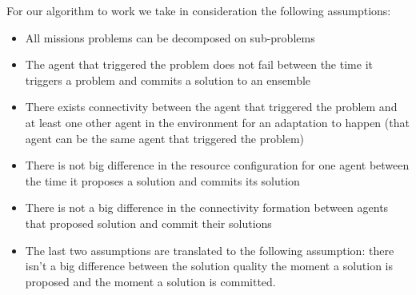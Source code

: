 \documentclass[journal]{IEEEtran}
\theoremstyle{definition}
\newcommand{\del}[1]{\textcolor{red}{\sout{#1}}} %
\begin{document}
 For our algorithm to work we take in consideration the following assumptions:
\begin{itemize}
\item All missions problems can be decomposed on sub-problems
\item The agent that triggered the problem does not fail between the time it triggers a problem and commits a solution to an ensemble %
\item There exists connectivity between the agent that triggered the problem and at least one other agent in the environment for an adaptation to happen (that agent can be the same agent that triggered the problem)
\item There is not big difference in the resource configuration for one agent %
between the time it proposes a solution and commits its solution
\item There is not a big difference in the %
connectivity formation between agents that proposed solution and commit their solutions
\item The last two assumptions are translated to the following assumption: %
there isn't a big difference between the  solution  quality the moment  a solution is proposed and the moment a solution is committed.
\end{itemize}

\end{document}
